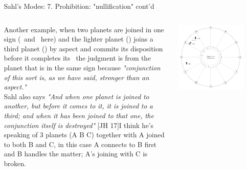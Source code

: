 \begin{frame}[t]{Sahl's Modes: 7. Prohibition: "nullification" cont'd}
\begin{columns}[T, onlytextwidth]
\footnotesize
Another example, when two planets are joined in one sign (\Moon\ and \Mars\ here) and the lighter planet (\Moon) joins a third planet (\Venus) by aspect and commits its disposition before it completes its \Conjunction\, the judgment is from the planet that is in the same sign because \textsl{"conjunction of this sort is, as we have said, stronger than an aspect."} \\
\vspace{0.1cm}
Sahl also says \textsl{"And when one planet is joined to another, but before it comes to it, it is joined to a third; and when it has been joined to that one, the conjunction itself is destroyed"} [JH 17]\footnotemark[1] I think he's speaking of 3 planets (A B C) together with A joined to both B and C, in this case A connects to B first and B handles the matter; A's joining with C is broken.

\begin{center}
{\includegraphics[width=0.9\textwidth]{charts/64a-nullification}} \\
\end{center}
\end{columns}
\end{frame}
